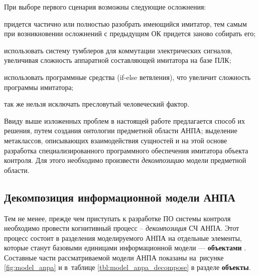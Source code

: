 При выборе первого сценария возможны следующие осложнения:
\begin{enumerate*}[label=\arabic*\upshape)]
    \item придется частично или полностью разобрать имеющийся имитатор, тем самым при возникновении 
        осложнений с предыдущим ОК придется заново собирать его;
    \item использовать систему тумблеров для коммутации электрических сигналов,
        увеличивая сложность аппаратной составляющей имитатора на базе ПЛК;
    \item использовать программные средства (if-else ветвления), что увеличит сложность программы имитатора;
    \item так же нельзя исключать пресловутый человеческий фактор.
\end{enumerate*}

Ввиду выше изложенных проблем в настоящей работе предлагается способ их решения,
путем создания онтологии предметной области АНПА;
выделение метаклассов, описывающих взаимодействия сущностей
и на этой основе разработка специализированного программного обеспечения
имитатора объекта контроля. Для этого необходимо произвести \textit{декомпозицию} модели предметной области.


\clearpage
\subsection{Декомпозиция информационной модели АНПА} \label{sec:anpa_decompose}

Тем не менее, прежде чем приступать к разработке ПО системы контроля необходимо провести когнитивный процесс -- \textit{декомпозиция} СЧ АНПА.
Этот процесс состоит в разделения моделируемого АНПА на отдельные элементы, которые станут базовыми единицами информационной модели --- \textbf{объектами} \cite{journal:vestnik_igeu:elizarova}.
Составные части рассматриваемой модели АНПА показаны на~рисунке \ref{fig:model_anpa} и в~таблице \ref{tbl:model_anpa_decompose} в разделе \textbf{объекты}.


